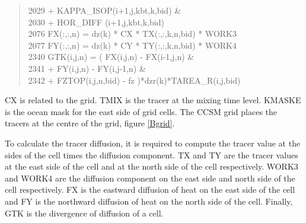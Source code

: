 \begin{appendices}
\begin{quotation}
2029 \hspace{1em} + KAPPA\_ISOP(i+1,j,kbt,k,bid)  \&\\
2030 \hspace{1em} + HOR\_DIFF  (i+1,j,kbt,k,bid)\\
2076 \hspace{1em} FX(:,:,n) = dz(k) * CX * TX(:,:,k,n,bid) * WORK3\\
2077 \hspace{1em} FY(:,:,n) = dz(k) * CY * TY(:,:,k,n,bid) * WORK4 \\
2340 \hspace{1em} GTK(i,j,n) = ( FX(i,j,n) - FX(i-1,j,n)  \&\\
2341 \hspace{1em}  + FY(i,j,n) - FY(i,j-1,n)  \&\\
2342 \hspace{1em}  + FZTOP(i,j,n,bid) - fz )*dzr(k)*TAREA\_R(i,j,bid)
\end{quotation}
CX is related to the grid. TMIX is the tracer at the mixing time level. KMASKE is the ocean mask for the east side of grid cells. The CCSM grid places the tracers at the centre of the grid, figure \ref{Bgrid}. 

To calculate the tracer diffusion, it is required to compute the tracer value at the sides of the cell times the diffusion component. TX and TY are the tracer values at the east side of the cell and at the north side of the cell respectively. WORK3 and WORK4 are the diffusion component on the east side and north side of the cell respectively.  FX is the eastward diffusion of heat on the east side of the cell and FY is the northward diffusion of heat on the north side of the cell. Finally, GTK is the divergence of diffusion of a cell. 


\end{appendices}
